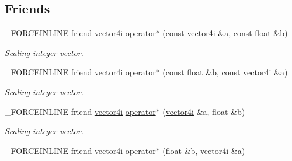 \subsection*{Friends}
\begin{DoxyCompactItemize}
\item 
\hypertarget{classbt_1_1vector4i_ac784c6ee6024d69a3c179c212e369131}{\-\_\-\-F\-O\-R\-C\-E\-I\-N\-L\-I\-N\-E friend \hyperlink{classbt_1_1vector4i}{vector4i} \hyperlink{classbt_1_1vector4i_ac784c6ee6024d69a3c179c212e369131}{operator$\ast$} (const \hyperlink{classbt_1_1vector4i}{vector4i} \&a, const float \&b)}\label{classbt_1_1vector4i_ac784c6ee6024d69a3c179c212e369131}

\begin{DoxyCompactList}\small\item\em Scaling integer vector. \end{DoxyCompactList}\item 
\hypertarget{classbt_1_1vector4i_af2cef43e5c013da075484d7eca0fcd98}{\-\_\-\-F\-O\-R\-C\-E\-I\-N\-L\-I\-N\-E friend \hyperlink{classbt_1_1vector4i}{vector4i} \hyperlink{classbt_1_1vector4i_af2cef43e5c013da075484d7eca0fcd98}{operator$\ast$} (const float \&b, const \hyperlink{classbt_1_1vector4i}{vector4i} \&a)}\label{classbt_1_1vector4i_af2cef43e5c013da075484d7eca0fcd98}

\begin{DoxyCompactList}\small\item\em Scaling integer vector. \end{DoxyCompactList}\item 
\hypertarget{classbt_1_1vector4i_a577fcfb21ac8ddb52effcd67eb04ec7f}{\-\_\-\-F\-O\-R\-C\-E\-I\-N\-L\-I\-N\-E friend \hyperlink{classbt_1_1vector4i}{vector4i} \hyperlink{classbt_1_1vector4i_a577fcfb21ac8ddb52effcd67eb04ec7f}{operator$\ast$} (\hyperlink{classbt_1_1vector4i}{vector4i} \&a, float \&b)}\label{classbt_1_1vector4i_a577fcfb21ac8ddb52effcd67eb04ec7f}

\begin{DoxyCompactList}\small\item\em Scaling integer vector. \end{DoxyCompactList}\item 
\hypertarget{classbt_1_1vector4i_ae1ca8ef95979adc6b293921dd4fd08e9}{\-\_\-\-F\-O\-R\-C\-E\-I\-N\-L\-I\-N\-E friend \hyperlink{classbt_1_1vector4i}{vector4i} \hyperlink{classbt_1_1vector4i_ae1ca8ef95979adc6b293921dd4fd08e9}{operator$\ast$} (float \&b, \hyperlink{classbt_1_1vector4i}{vector4i} \&a)}\label{classbt_1_1vector4i_ae1ca8ef95979adc6b293921dd4fd08e9}


\end{DoxyCompactItemize}
